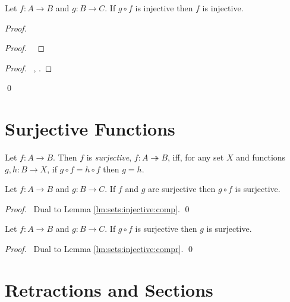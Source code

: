 \begin{lm}
  \label{lm:sets:injective:compr}
 Let $f : A \rightarrow B$ and $g : B \rightarrow C$. If $g \circ f$ is
injective then $f$ is injective.
\end{lm}

\begin{proof}
 \pf
 \begin{proof}
   \pf\ 
 \end{proof}
 \begin{proof}
   \pf\ , .
 \end{proof}
 \qed
\end{proof}

\section{Surjective Functions}

\begin{df}[Surjective]
  Let $f : A \rightarrow B$. Then $f$ is \emph{surjective}, $f : A
\twoheadrightarrow B$, iff, for any set
  $X$ and functions $g, h : B \rightarrow X$, if $g \circ f = h \circ f$ then
  $g
  = h$.
\end{df}

\begin{lm}
 Let $f : A \rightarrow B$ and $g : B \rightarrow C$. If $f$ and $g$ are
surjective then $g \circ f$ is surjective.
\end{lm}

\begin{proof}
 \pf\ Dual to Lemma \ref{lm:sets:injective:comp}. \qed
\end{proof}

\begin{lm}
 Let $f : A \rightarrow B$ and $g : B \rightarrow C$. If $g \circ f$ is
surjective then $g$ is surjective.
\end{lm}

\begin{proof}
 \pf\ Dual to Lemma \ref{lm:sets:injective:compr}. \qed
\end{proof}

\section{Retractions and Sections}

